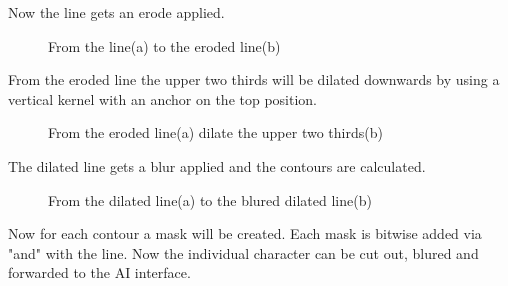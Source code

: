 Now the line gets an erode applied.

\begin{figure}[H]
    \centering
    \qquad
    \caption{From the line(a) to the eroded line(b)}
\end{figure}

From the eroded line the upper two thirds will be dilated downwards by using a vertical kernel with an anchor on the top position.

\begin{figure}[H]
    \centering
    \qquad
    \caption{From the eroded line(a) dilate the upper two thirds(b)}
\end{figure}

The dilated line gets a blur applied and the contours are calculated.

\begin{figure}[H]
    \centering
    \qquad
    \caption{From the dilated line(a) to the blured dilated line(b)}
\end{figure}

Now for each contour a mask will be created.
Each mask is bitwise added via "and" with the line.
Now the individual character can be cut out, blured and forwarded to the AI interface.

